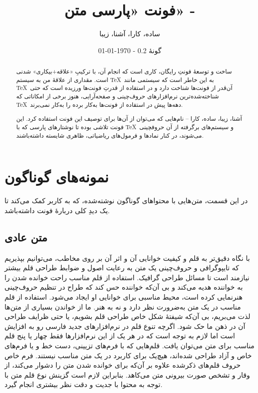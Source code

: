 \documentclass[10pt,a5paper]{article}
\title{\textbf{فونت «پارسی متن» - \lr{``Parsi Matn''}}}
\author{ساده، کارا، آشنا، زیبا}
\date{%
گونۀ 0.2
\quad - \quad \today \\
\lr{Version 2.0 \quad - \quad \latintoday}
}
\theoremstyle{definition}
\theoremstyle{plain}
\begin{document}
\maketitle

\vspace*{1cm}


\begin{abstract}
ساخت و توسعۀ فونتِ رایگان، کاری است که انجام آن، با ترکیبِ «علاقه+بیکاری» شدنی است. مقداری از علاقۀ من به سیستم \TeX\ به این خاطر است که سیستمی مانند \TeX\ آن‌قدر از فونت‌ها شناخت دارد و در استفاده از قدرتِ فونت‌ها ورزیده است که حتی شناخته‌شده‌ترین نرم‌افزارهای حروف‌چینی و صفحه‌آرایی، هنوز برخی از امکاناتی که \TeX\ دهه‌ها پیش در استفاده از فونت‌ها به‌کار برده را به‌کار نمی‌برند.

آشنا، زیبا، ساده، کارا -- نام‌هایی که می‌توان از آن‌ها برای توصیف این فونت استفاده کرد. این فونت تلاشی بوده تا نوشتارهای پارسی که با \TeX\ و سیستم‌های برگرفته از آن حروفچینی می‌شوند، در کنار نمادها و فرمول‌های ریاضیاتی، ظاهری شایسته داشته‌باشند.
\end{abstract}

\newpage

\section{نمونه‌های گوناگون}
در این قسمت، متن‌هایی با محتواهای گوناگون نوشته‌شده، که به کاربر کمک می‌کند تا یک دیدِ کلی دربارۀ فونت داشته‌باشد.

\subsection{متن عادی}
با نگاه دقیق‌تر به قلم و کیفیت خوانایی آن و اثر آن بر روی مخاطب، می‌توانیم بپذیریم که تایپوگرافی و حروف‌چینی یک متن به رعایت اصول و ضوابط طراحی قلم بیشتر نیازمند است تا مسائل طراحی گرافیک. استفاده از قلم مناسب راحت خوانده شدن را به خواننده هدیه می‌کند و بی آن‌که خواننده حس کند که طراح در تنظیم حروف‌چینی هنرنمایی کرده است، محیط مناسبی برای خوانایی او ایجاد می‌شود. استفاده از قلم مناسب در یک متن به‌ضرورت نظر دارد و نه به هنر. ما از خواندن بسیاری از متن‌ها لذت می‌بریم، بی آن‌که شیفتهٔ شکل خاص طراحی قلم بشویم، یا حتی ظرایف طراحی آن در ذهن ما حک شود. اگرچه تنوع قلم در نرم‌افزارهای جدید فارسی رو به افزایش است اما لازم به توجه است که در هر یک از این نرم‌افزارها فقط چهار یا پنج قلم مناسب برای متن می‌توان یافت. قلم‌هایی که با فرم‌های تزیینی، دست خط و یا فرم‌های خاص و آزاد طراحی شده‌اند، هیچ‌یک برای کاربرد در یک متن مناسب نیستند. فرم خاص حروف قلم‌های ذکرشده علاوه بر آن‌که برای خوانده شدن متن را دشوار می‌کند، از وقار و تشخص صورت بیرونی متن می‌کاهد. بنابراین لازم است گزینش نوع قلم متن با توجه به محتوا با جدیت و دقت نظر بیشتری انجام گیرد.
\end{document}
